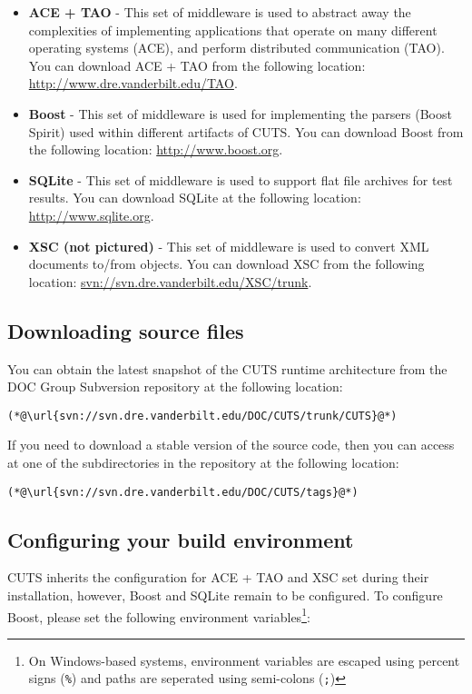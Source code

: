 \begin{itemize} 
  \item \textbf{ACE + TAO} - This set of middleware is used to abstract away the 
  complexities of implementing applications that operate on many different operating
  systems (ACE), and perform distributed communication (TAO). You can download ACE + TAO
  from the following location: \url{http://www.dre.vanderbilt.edu/TAO}.

  \item \textbf{Boost} - This set of middleware is used for implementing the parsers 
  (Boost Spirit) used within different artifacts of CUTS. You can download Boost from
  the following location: \url{http://www.boost.org}.

  \item \textbf{SQLite} - This set of middleware is used to support flat file archives
  for test results. You can download SQLite at the following location: 
  \url{http://www.sqlite.org}.

  \item \textbf{XSC (not pictured)} - This set of middleware is used to convert 
  XML documents to/from objects. You can download XSC from the following location: 
  \url{svn://svn.dre.vanderbilt.edu/XSC/trunk}.
\end{itemize}

\subsection{Downloading source files}
\label{sec:install-download-runtime}

You can obtain the latest snapshot of the CUTS runtime architecture from the
DOC Group Subversion repository at the following location:
\begin{lstlisting}
(*@\url{svn://svn.dre.vanderbilt.edu/DOC/CUTS/trunk/CUTS}@*)
\end{lstlisting}
If you need to download a stable version of the source code, then you can 
access at one of the subdirectories in the repository at the following location:
\begin{lstlisting}
(*@\url{svn://svn.dre.vanderbilt.edu/DOC/CUTS/tags}@*)
\end{lstlisting}

\subsection{Configuring your build environment}

CUTS inherits the configuration for ACE + TAO and XSC set during their installation,
however, Boost and SQLite remain to be configured. To configure
Boost, please set the following environment variables\footnote{On Windows-based systems,
environment variables are escaped using percent signs (\texttt{\%}) and paths are 
seperated using semi-colons (\texttt{;})}:

